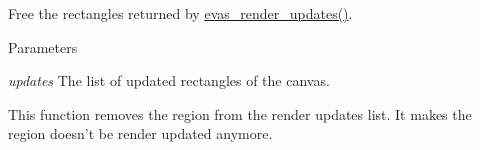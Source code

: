 Free the rectangles returned by \hyperlink{group__Evas__Canvas_ga49650dcc731a151d4881106b56f7a5ca}{evas\_\-render\_\-updates()}. 


\begin{DoxyParams}{Parameters}
\item[{\em updates}]The list of updated rectangles of the canvas.\end{DoxyParams}
This function removes the region from the render updates list. It makes the region doesn't be render updated anymore. 
